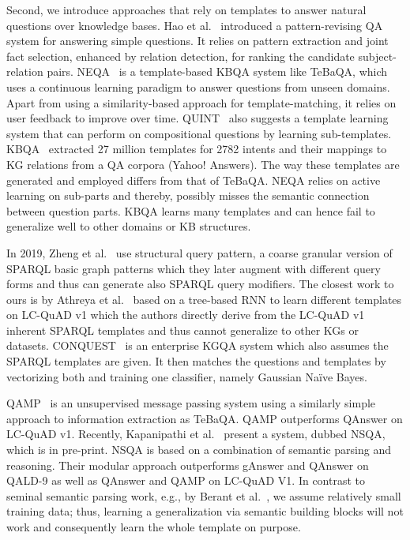 \documentclass{IOS-Book-Article}
\begin{document}
Second, we introduce approaches that rely on templates to answer natural questions over knowledge bases.
Hao et al.~\cite{DBLP:conf/coling/HaoLHLZ18} introduced a pattern-revising QA system for answering simple questions. It relies on pattern extraction and joint fact selection, enhanced by relation detection, for ranking the candidate subject-relation pairs. 
NEQA~\cite{DBLP:conf/www/AbujabalRYW18} is a template-based KBQA system like TeBaQA, which uses a continuous learning paradigm to answer questions from unseen domains. Apart from using a similarity-based approach for template-matching, it relies on user feedback to improve over time. QUINT~\cite{Abujabal:2017:ATG:3038912.3052583} also suggests a template learning system that can perform on compositional questions by learning sub-templates.
KBQA~\cite{DBLP:journals/pvldb/CuiXWSHW17} extracted 27 million templates for 2782 intents and their mappings to KG relations from a QA corpora (Yahoo! Answers). 
The way these templates are generated and employed differs from that of TeBaQA. NEQA relies on active learning on sub-parts and thereby, possibly misses the semantic connection between question parts. KBQA learns many templates and can hence fail to generalize well to other domains or KB structures. 

In 2019, Zheng et al.~\cite{zheng2019question} use structural query pattern, a coarse granular version of SPARQL basic graph patterns which they later augment with different query forms and thus can generate also SPARQL query modifiers.
The closest work to ours is by Athreya et al.~\cite{athreya2020templatebased} based on a tree-based RNN to learn different templates on LC-QuAD v1 which the authors directly derive from the LC-QuAD v1 inherent SPARQL templates and thus cannot generalize to other KGs or datasets. 
CONQUEST~\cite{DBLP:conf/nldb/AvilaFMV20} is an enterprise KGQA system which also assumes the SPARQL templates are given. It then matches the questions and templates by vectorizing both and training one classifier, namely Gaussian Naïve Bayes.

QAMP~\cite{DBLP:conf/cikm/VakulenkoGPRC19} is an unsupervised message passing system using a similarly simple approach to information extraction as TeBaQA. QAMP outperforms QAnswer on LC-QuAD v1.
Recently, Kapanipathi et al.~\cite{DBLP:journals/corr/abs-2012-01707} present a system, dubbed NSQA, which is in pre-print. NSQA is based on a combination of semantic parsing and reasoning. Their modular approach outperforms gAnswer and QAnswer on QALD-9 as well as QAnswer and QAMP on LC-QuAD V1. 
In contrast to seminal semantic parsing work, e.g., by Berant et al.~\cite{berant2013semantic}, we assume relatively small training data; thus, learning a generalization via semantic building blocks will not work and consequently learn the whole template on purpose. 
 
\end{document}
